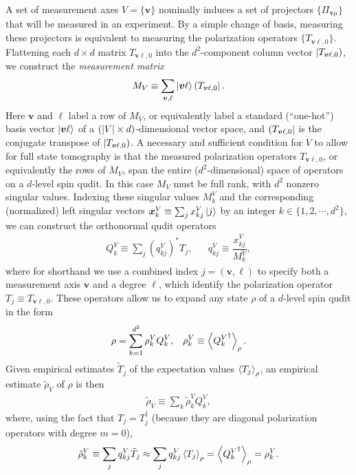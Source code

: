 \documentclass[nofootinbib,twocolumn]{revtex4-1}
\newcommand{\f}[2]{\dfrac{#1}{#2}} %
\newcommand{\p}[1]{\left(#1\right)} %
\newcommand{\bk}{\Braket} %
\renewcommand{\set}[1]{\{#1\}} %
\def\obra#1{\mathinner{({#1}|}}
\def\oket#1{\mathinner{|{#1})}}
\begin{document}
A set of measurement axes $V=\set{\bm v}$ nominally induces a set of projectors $\set{\Pi_{\bm v\mu}}$ that will be measured in an experiment.
By a simple change of basis, measuring these projectors is equivalent to measuring the polarization operators $\set{T_{\bm v\ell,0}}$.
Flattening each $d\times d$ matrix $T_{\bm v\ell,0}$ into the $d^2$-component column vector $\oket{T_{\bm v\ell,0}}$, we construct the {\it measurement matrix}
\begin{align}
  M_V \equiv \sum_{\bm v,\ell} \ket{\bm v\ell} \obra{T_{\bm v\ell,0}}.
  \label{eq:meas_mat}
\end{align}
Here $\bm v$ and $\ell$ label a row of $M_V$, or equivalently label a standard (``one-hot'') basis vector $\ket{\bm v\ell}$ of a $\p{\abs{V}\times d}$-dimensional vector space, and $\obra{T_{\bm v\ell,0}}$ is the conjugate transpose of $\oket{T_{\bm v\ell,0}}$.
A necessary and sufficient condition for $V$ to allow for full state tomography is that the measured polarization operators $T_{\bm v\ell,0}$, or equivalently the rows of $M_V$, span the entire ($d^2$-dimensional) space of operators on a $d$-level spin qudit.
In this case $M_V$ must be full rank, with $d^2$ nonzero singular values.
Indexing these singular values $M^V_k$ and the corresponding (normalized) left singular vectors $\bm x^V_k\equiv \sum_j x^V_{kj} \ket{j}$ by an integer $k\in\set{1,2,\cdots,d^2}$, we can construct the orthonormal qudit operators
\begin{align}
  Q^V_k \equiv \sum_j \p{q^V_{kj}}^* T_j,
  &&
  q^V_{kj} \equiv \f{x^V_{kj}}{M^V_k},
\end{align}
where for shorthand we use a combined index $j=\p{\bm v,\ell}$ to specify both a measurement axis $\bm v$ and a degree $\ell$, which identify the polarization operator $T_j\equiv T_{\bm v\ell,0}$.
These operators allow us to expand any state $\rho$ of a $d$-level spin qudit in the form
\begin{align}
  \rho = \sum_{k=1}^{d^2} \rho_k^V Q_k^V,
  &&
  \rho_k^V \equiv \bk{{Q^V_k}^\dag}_\rho.
\end{align}
Given empirical estimates $\tilde T_j$ of the expectation values $\bk{T_j}_\rho$, an empirical estimate $\tilde\rho_V$ of $\rho$ is then
\begin{align}
  \tilde\rho_V \equiv \sum_k \tilde\rho^V_k Q^V_k,
  \label{eq:reconstructed_state}
\end{align}
where, using the fact that $T_j=T_j^\dag$ (because they are diagonal polarization operators with degree $m=0$),
\begin{align}
  \tilde\rho^V_k \equiv \sum_j q^V_{kj} \tilde T_j
  \approx \sum_j q^V_{kj} \bk{T_j}_\rho
  = \bk{{Q^V_k}^\dag}_\rho
  = \rho^V_k.
\end{align}
\end{document}
